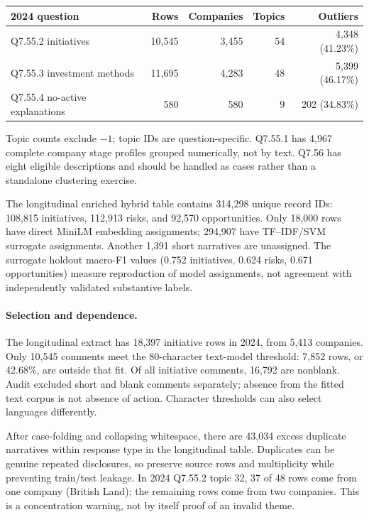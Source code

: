 \documentclass[11pt,a4paper]{article}
\begin{document}
\begin{center}
\small
\begin{tabular}{lrrrr}
\toprule
2024 question & Rows & Companies & Topics & Outliers \\
\midrule
Q7.55.2 initiatives & 10,545 & 3,455 & 54 & 4,348 (41.23\%) \\
Q7.55.3 investment methods & 11,695 & 4,283 & 48 & 5,399 (46.17\%) \\
Q7.55.4 no-active explanations & 580 & 580 & 9 & 202 (34.83\%) \\
\bottomrule
\end{tabular}
\end{center}
Topic counts exclude $-1$; topic IDs are question-specific. Q7.55.1 has
4,967 complete company stage profiles grouped numerically, not by text.
Q7.56 has eight eligible descriptions and should be handled as cases rather
than a standalone clustering exercise.

The longitudinal enriched hybrid table contains 314,298 unique record IDs:
108,815 initiatives, 112,913 risks, and 92,570 opportunities. Only 18,000
rows have direct MiniLM embedding assignments; 294,907 have TF--IDF/SVM
surrogate assignments. Another 1,391 short narratives are unassigned.
The surrogate holdout macro-F1 values (0.752 initiatives, 0.624 risks,
0.671 opportunities) measure reproduction of model assignments, not
agreement with independently validated substantive labels.

\paragraph{Selection and dependence.}
The longitudinal extract has 18,397 initiative rows in 2024, from 5,413
companies. Only 10,545 comments meet the 80-character text-model threshold:
7,852 rows, or 42.68\%, are outside that fit. Of all initiative comments,
16,792 are nonblank. Audit excluded short and blank comments separately;
absence from the fitted text corpus is not absence of action.
Character thresholds can also select languages differently.

After case-folding and collapsing whitespace, there are 43,034 excess
duplicate narratives within response type in the longitudinal table.
Duplicates can be genuine repeated disclosures, so preserve source rows
and multiplicity while preventing train/test leakage. In 2024 Q7.55.2
topic 32, 37 of 48 rows come from one company (British Land); the remaining
rows come from two companies. This is a concentration warning, not by
itself proof of an invalid theme.
\end{document}
